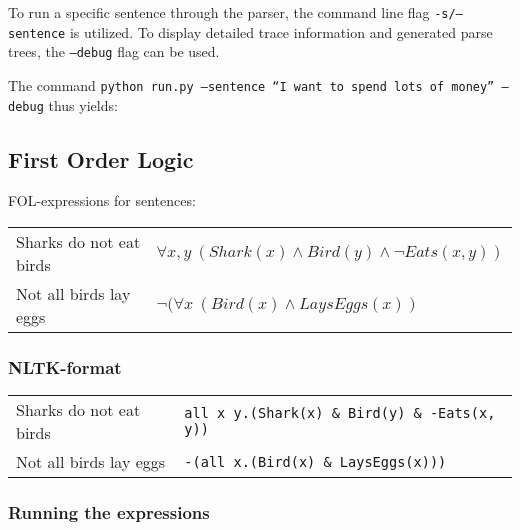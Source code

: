 \documentclass[11pt,a4paper]{article}
\begin{document}
        To run a specific sentence through the parser, the command line flag \texttt{-s/--sentence} is utilized.
        To display detailed trace information and generated parse trees, the \texttt{--debug} flag can be used.

        The command \texttt{python run.py --sentence ``I want to spend lots of money'' --debug} thus yields:

        {\footnotesize
          
        }



    \subsection{First Order Logic} %
    \label{sub:first_order_logic}

      FOL-expressions for sentences: \\

      \begin{tabular}{ll}
        Sharks do not eat birds & $ \forall x, y \: ( Shark(x) \land Bird(y) \land \neg Eats(x, y) ) $ \\
        Not all birds lay eggs & $ \neg ( \forall x \: ( Bird(x) \land LaysEggs(x) ) $ \\
      \end{tabular}

      \subsubsection{NLTK-format} %
      \label{ssub:nltk_format}

        \begin{tabular}{ll}
          Sharks do not eat birds & \texttt{all x y.(Shark(x) \& Bird(y) \& -Eats(x, y))} \\
          Not all birds lay eggs  & \texttt{-(all x.(Bird(x) \& LaysEggs(x)))} \\
        \end{tabular}


      \subsubsection{Running the expressions} %
      \label{ssub:running_the_expressions}
\end{document}
